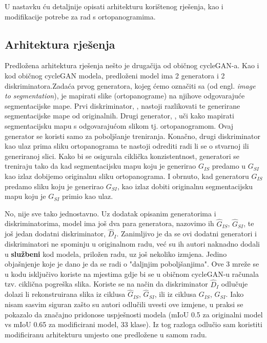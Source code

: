 U nastavku ću detaljnije opisati arhitekturu korištenog rješenja, kao i modifikacije potrebe za rad s ortopanogramima.
\subsection{Arhitektura rješenja}

Predložena arhitektura rješenja nešto je drugačija od običnog cycleGAN-a. 
Kao i kod običnog cycleGAN modela, predloženi model ima 2 generatora i 2 diskriminatora.Zadaća prvog generatora, kojeg ćemo označiti sa  (od engl. \textit{image to segmentation}), je mapirati slike (ortopanograme) na njihove odgovarajuće segmentacijske mape. Prvi diskriminator, , nastoji razlikovati te generirane segmentacijske mape od originalnih. Drugi generator,  , uči kako mapirati segmentacijsku mapu s odgovarajućom slikom tj. ortopanogramom. Ovaj generator se koristi samo za poboljšanje treniranja. Konačno, drugi diskriminator  kao ulaz prima sliku ortopanograma te nastoji odrediti radi li se o stvarnoj ili generiranoj slici. Kako bi se osigurala ciklička konzistentnost, generatori se treniraju tako da kad segmentacijsku mapu koju je generirao $G_{IS}$ predamo u $G_{SI}$ kao izlaz dobijemo originalnu sliku ortopanograma. I obrnuto, kad generatoru $G_{IS}$ predamo sliku koju je generirao $G_{SI}$, kao izlaz dobiti originalnu segmentacijsku mapu koju je $G_{SI}$ primio kao ulaz.

No, nije sve tako jednostavno. Uz dodatak opisanim generatorima i diskriminatorima, model ima još dva para generatora, nazovimo ih $\hat{G}_{IS}$, $\hat{G}_{SI}$, te još jedan dodatni diskriminator, $\hat{D}_{I}$. Zanimljivo je da se ovi dodatni generatori i diskriminatori ne spominju u originalnom radu, već su ih autori naknadno dodali u \textbf{službeni} kod modela, priložen radu, uz još nekoliko izmjena. Jedino objašnjenje koje je dano je da se radi o "daljnjim poboljšanjima". Ove 3 mreže se u kodu isključivo koriste na mjestima gdje bi se u običnom cycleGAN-u računala tzv. ciklična pogreška slika. Koriste se na način da diskriminator $\hat{D}_{I}$ odlučuje dolazi li rekonstruirana slika iz ciklusa $\hat{G}_{IS}$, $\hat{G}_{SI}$, ili iz ciklusa 
$G_{IS}$, $G_{SI}$. Iako nisam sasvim siguran zašto su autori odlučili uvesti ove izmjene, u praksi se pokazalo da značajno pridonose uspješnosti modela (mIoU 0.5 za originalni model vs mIoU 0.65 za modificirani model, 33 klase). Iz tog razloga odlučio sam koristiti modificiranu arhitekturu umjesto one predložene u samom radu.\\

